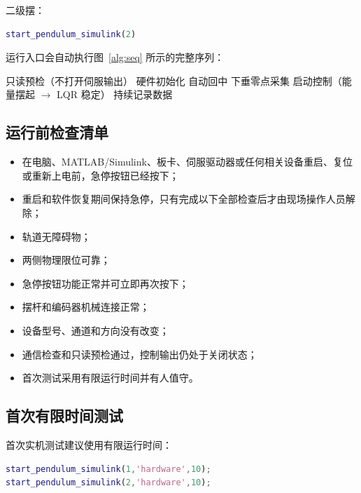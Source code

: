 \documentclass[12pt,a4paper]{article}
\newcommand{\cmark}{\ding{51}}
\begin{document}
二级摆：
\begin{lstlisting}[language=Matlab, caption={二级摆实机启动}, label={lst:run2}]
start_pendulum_simulink(2)
\end{lstlisting}

运行入口会自动执行图~\ref{alg:seq} 所示的完整序列：

\begin{algorithm}[htbp]
    \caption{实机运行自动序列}
    \label{alg:seq}
    \begin{algorithmic}[1]
        \State 只读预检（不打开伺服输出）
        \State 硬件初始化
        \State 自动回中
        \State 下垂零点采集
        \State 启动控制（能量摆起 $\rightarrow$ LQR 稳定）
        \State 持续记录数据
    \end{algorithmic}
\end{algorithm}

\subsection{运行前检查清单}

\begin{itemize}[label=\cmark]
    \item 在电脑、MATLAB/Simulink、板卡、伺服驱动器或任何相关设备重启、复位或重新上电前，急停按钮已经按下；
    \item 重启和软件恢复期间保持急停，只有完成以下全部检查后才由现场操作人员解除；
    \item 轨道无障碍物；
    \item 两侧物理限位可靠；
    \item 急停按钮功能正常并可立即再次按下；
    \item 摆杆和编码器机械连接正常；
    \item 设备型号、通道和方向没有改变；
    \item 通信检查和只读预检通过，控制输出仍处于关闭状态；
    \item 首次测试采用有限运行时间并有人值守。
\end{itemize}

\subsection{首次有限时间测试}

首次实机测试建议使用有限运行时间：

\begin{lstlisting}[language=Matlab, caption={有限时间首次测试（10 秒）}, label={lst:firstrun}]
start_pendulum_simulink(1,'hardware',10);
start_pendulum_simulink(2,'hardware',10);
\end{lstlisting}
\end{document}
